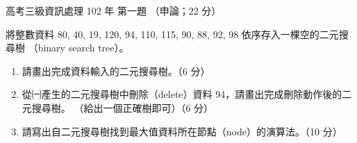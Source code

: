 \begin{pastexam}[label={px:gk3-102-ds-01}]{高考三級資訊處理 102 年 第一題}
（申論；22 分）

將整數資料 80, 40, 19, 120, 94, 110, 115, 90, 88, 92, 98 依序存入一棵空的二元搜尋樹
（binary search tree）。
\begin{enumerate}[leftmargin=2.6em, labelsep=0.4em]
\item[㈠] 請畫出完成資料輸入的二元搜尋樹。（6 分）
\item[㈡] 從㈠產生的二元搜尋樹中刪除（delete）資料 94，請畫出完成刪除動作後的二元搜尋樹。
（給出一個正確樹即可）（6 分）
\item[㈢] 請寫出自二元搜尋樹找到最大值資料所在節點（node）的演算法。（10 分）
\end{enumerate}
\end{pastexam}

